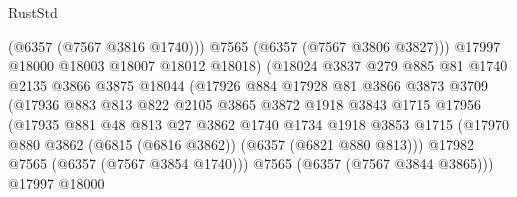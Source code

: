 \begin{lexlean}{RustStd}
\begin{coremodule}
                                    (@6357 (@7567 @3816 @1740)))
                                  @7565
                                  (@6357 (@7567 @3806 @3827)))
                                @17997
                                @18000
                                @18003
                                @18007
                                @18012
                                @18018)
                              (@18024
                                @3837
                                @279
                                @885
                                @81
                                @1740
                                @2135
                                @3866
                                @3875
                                @18044
                                (@17926
                                  @884
                                  @17928
                                  @81
                                  @3866
                                  @3873
                                  @3709
                                  (@17936
                                    @883
                                    @813
                                    @822
                                    @2105
                                    @3865
                                    @3872
                                    @1918
                                    @3843
                                    @1715
                                    @17956
                                    (@17935
                                      @881
                                      @48
                                      @813
                                      @27
                                      @3862
                                      @1740
                                      @1734
                                      @1918
                                      @3853
                                      @1715
                                      (@17970
                                        @880
                                        @3862
                                        (@6815 (@6816 @3862))
                                        (@6357 (@6821 @880 @813)))
                                      @17982
                                      @7565
                                      (@6357 (@7567 @3854 @1740)))
                                    @7565
                                    (@6357 (@7567 @3844 @3865)))
                                  @17997
                                  @18000

\end{coremodule}
\end{lexlean}
